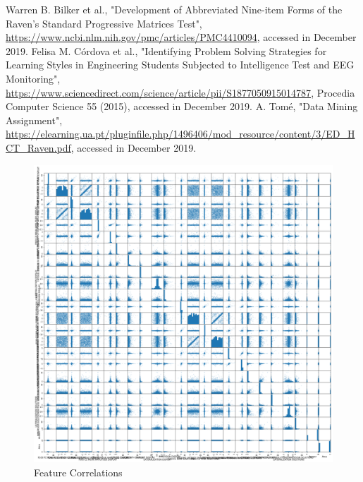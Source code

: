 \documentclass[conference]{IEEEtran}
\begin{document}


\begin{thebibliography}{00}
 Warren B. Bilker et al., "Development of Abbreviated Nine-item Forms of the Raven’s Standard Progressive Matrices Test", \url{https://www.ncbi.nlm.nih.gov/pmc/articles/PMC4410094}, accessed in December 2019.
 Felisa M. Córdova et al., "Identifying Problem Solving Strategies for Learning Styles in Engineering Students Subjected to Intelligence Test and EEG Monitoring", \url{https://www.sciencedirect.com/science/article/pii/S1877050915014787}, Procedia Computer Science 55 (2015), accessed in December 2019.
 A. Tomé, "Data Mining Assignment", \url{https://elearning.ua.pt/pluginfile.php/1496406/mod_resource/content/3/ED_HCT_Raven.pdf}, accessed in December 2019.

\end{thebibliography}
\vspace{12pt}

\clearpage
\appendix
\begin{figure}[h]
    \centering
    \includegraphics[width=2\linewidth]{featurecorrelation.png}
    \caption{Feature Correlations}
    \label{fig:feature}
\end{figure}
\end{document}
